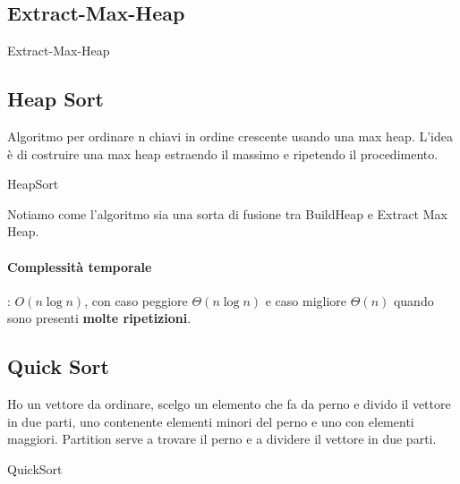 \documentclass{article}
\begin{document}
\hypertarget{extractmaxheap}{}\subsection{Extract-Max-Heap} %

\begin{algorithm}[H]
\caption{Extract-Max-Heap}
\end{algorithm}


    
\hypertarget{heapsort}{}\subsection{Heap Sort} %
Algoritmo per ordinare n chiavi in ordine crescente usando una max heap. L'idea è di costruire una max heap estraendo il massimo e ripetendo il procedimento.
\begin{algorithm}[H]
\caption{HeapSort}
\end{algorithm}

Notiamo come l'algoritmo sia una sorta di fusione tra BuildHeap e Extract Max Heap.

\paragraph{Complessità temporale}: $O(n \log n)$, con caso peggiore $\Theta(n \log n)$ e caso migliore $\Theta(n)$ quando sono presenti \textbf{molte ripetizioni}. 

\hypertarget{quicksort}{}\subsection{Quick Sort} %
Ho un vettore da ordinare, scelgo un elemento che fa da perno e divido il vettore in due parti, uno contenente 
elementi minori del perno e uno con elementi maggiori. Partition serve a trovare il perno e a dividere il vettore in due parti.

\begin{algorithm}[H]
\caption{QuickSort}
\end{algorithm}
\end{document}
